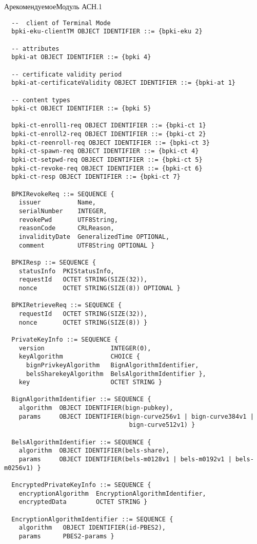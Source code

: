 \begin{appendix}{А}{рекомендуемое}{Модуль АСН.1}
\begin{verbatim}
  --  client of Terminal Mode
  bpki-eku-clientTM OBJECT IDENTIFIER ::= {bpki-eku 2}

  -- attributes
  bpki-at OBJECT IDENTIFIER ::= {bpki 4}

  -- certificate validity period
  bpki-at-certificateValidity OBJECT IDENTIFIER ::= {bpki-at 1}

  -- content types
  bpki-сt OBJECT IDENTIFIER ::= {bpki 5}

  bpki-ct-enroll1-req OBJECT IDENTIFIER ::= {bpki-ct 1}
  bpki-ct-enroll2-req OBJECT IDENTIFIER ::= {bpki-ct 2}
  bpki-ct-reenroll-req OBJECT IDENTIFIER ::= {bpki-ct 3}
  bpki-ct-spawn-req OBJECT IDENTIFIER ::= {bpki-ct 4}
  bpki-ct-setpwd-req OBJECT IDENTIFIER ::= {bpki-ct 5}
  bpki-ct-revoke-req OBJECT IDENTIFIER ::= {bpki-ct 6}
  bpki-ct-resp OBJECT IDENTIFIER ::= {bpki-ct 7}

  BPKIRevokeReq ::= SEQUENCE {
    issuer          Name,
    serialNumber    INTEGER,
    revokePwd       UTF8String,
    reasonCode      CRLReason,
    invalidityDate  GeneralizedTime OPTIONAL,
    comment         UTF8String OPTIONAL }

  BPKIResp ::= SEQUENCE { 
    statusInfo  PKIStatusInfo,
    requestId   OCTET STRING(SIZE(32)),
    nonce       OCTET STRING(SIZE(8)) OPTIONAL }

  BPKIRetrieveReq ::= SEQUENCE {
    requestId   OCTET STRING(SIZE(32)),
    nonce       OCTET STRING(SIZE(8)) }

  PrivateKeyInfo ::= SEQUENCE {
    version                  INTEGER(0),
    keyAlgorithm             CHOICE {
      bignPrivkeyAlgorithm   BignAlgorithmIdentifier,
      belsSharekeyAlgorithm  BelsAlgorithmIdentifier },
    key                      OCTET STRING }
  
  BignAlgorithmIdentifier ::= SEQUENCE {
    algorithm  OBJECT IDENTIFIER(bign-pubkey),
    params     OBJECT IDENTIFIER(bign-curve256v1 | bign-curve384v1 | 
                                  bign-curve512v1) }
  
  BelsAlgorithmIdentifier ::= SEQUENCE {
    algorithm  OBJECT IDENTIFIER(bels-share),
    params     OBJECT IDENTIFIER(bels-m0128v1 | bels-m0192v1 | bels-m0256v1) }

  EncryptedPrivateKeyInfo ::= SEQUENCE {
    encryptionAlgorithm  EncryptionAlgorithmIdentifier,
    encryptedData        OCTET STRING }
  
  EncryptionAlgorithmIdentifier ::= SEQUENCE {
    algorithm   OBJECT IDENTIFIER(id-PBES2),
    params      PBES2-params }
  

\end{verbatim}
\end{appendix}
